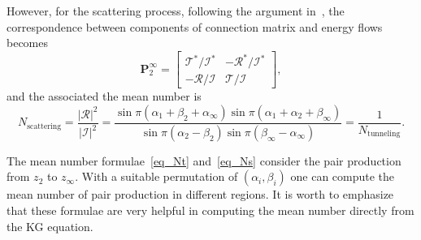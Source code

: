 \documentclass[aps,nofootinbib,superscriptaddress
]{revtex4}
\begin{document}
\begin{appendix}
However, for the scattering process, following the argument in~\cite{Chen:2022hpe}, the correspondence between components of connection matrix and energy flows becomes
\begin{equation}
\mathbf{P}_2^\infty = \begin{bmatrix} \mathcal{T}^*/\mathcal{I}^* & - \mathcal{R}^*/\mathcal{I}^* \\ -\mathcal{R}/\mathcal{I} & \mathcal{T}/\mathcal{I} \end{bmatrix},
\end{equation}
and the associated the mean number is
\begin{equation} \label{eq_Ns}
N_\textrm{scattering} = \frac{|\mathcal{R}|^2}{|\mathcal{I}|^2} = \frac{\sin \pi(\alpha_1 + \beta_2 + \alpha_\infty) \sin \pi(\alpha_1 + \alpha_2 + \beta_\infty)}{\sin \pi (\alpha_2 - \beta_2) \sin \pi(\beta_\infty - \alpha_\infty)} = \frac1{N_\textrm{tunneling}}.
\end{equation}

The mean number formulae~\eqref{eq_Nt} and~\eqref{eq_Ns} consider the pair production from $z_2$ to $z_\infty$. With a suitable permutation of $(\alpha_i, \beta_i)$ one can compute the mean number of pair production in different regions. It is worth to emphasize that these formulae are very helpful in computing the mean number directly from the KG equation.


\end{appendix}
\end{document}
